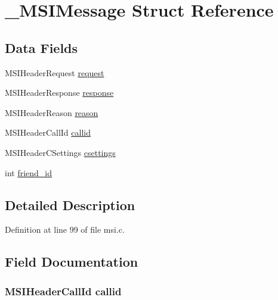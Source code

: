 \hypertarget{struct___m_s_i_message}{\section{\+\_\+\+M\+S\+I\+Message Struct Reference}
\label{struct___m_s_i_message}
}
\subsection*{Data Fields}
\begin{DoxyCompactItemize}
\item 
M\+S\+I\+Header\+Request \hyperlink{struct___m_s_i_message_a43928947ba3f33772bdeee09fd89557a}{request}
\item 
M\+S\+I\+Header\+Response \hyperlink{struct___m_s_i_message_a03f0f34008bf8be095af614ca99ea53f}{response}
\item 
M\+S\+I\+Header\+Reason \hyperlink{struct___m_s_i_message_aec4373dacf43cd56b5e67d2b04b63f5a}{reason}
\item 
M\+S\+I\+Header\+Call\+Id \hyperlink{struct___m_s_i_message_a0cb3f797b633561175096933c2eb003e}{callid}
\item 
M\+S\+I\+Header\+C\+Settings \hyperlink{struct___m_s_i_message_a4b09316f11dc8e9fe3b3357a6d48db56}{csettings}
\item 
int \hyperlink{struct___m_s_i_message_af43a034662e9bcac38e3bf4c9c150c19}{friend\+\_\+id}
\end{DoxyCompactItemize}


\subsection{Detailed Description}


Definition at line 99 of file msi.\+c.



\subsection{Field Documentation}
\hypertarget{struct___m_s_i_message_a0cb3f797b633561175096933c2eb003e}{
\subsubsection[{callid}]{\setlength{\rightskip}{0pt plus 5cm}M\+S\+I\+Header\+Call\+Id callid}}\label{struct___m_s_i_message_a0cb3f797b633561175096933c2eb003e}


